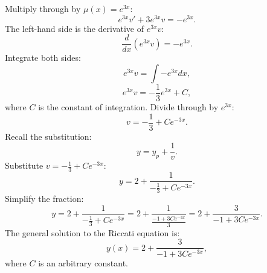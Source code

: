 \documentclass[12pt]{article}
\begin{document}
        Multiply through by \(\mu(x) = e^{3x}\):
        \[
        e^{3x}v' + 3e^{3x}v = -e^{3x}.
        \]
        The left-hand side is the derivative of \(e^{3x}v\):
        \[
        \frac{d}{dx}(e^{3x}v) = -e^{3x}.
        \]
        Integrate both sides:
        \[
        e^{3x}v = \int -e^{3x} dx,
        \]
        \[
        e^{3x}v = -\frac{1}{3}e^{3x} + C,
        \]
        where \(C\) is the constant of integration.
        Divide through by \(e^{3x}\):
        \[
        v = -\frac{1}{3} + Ce^{-3x}.
        \]
        Recall the substitution:
        \[
        y = y_p + \frac{1}{v}.
        \]
        Substitute \(v = -\frac{1}{3} + Ce^{-3x}\):
        \[
        y = 2 + \frac{1}{-\frac{1}{3} + Ce^{-3x}}.
        \]
        Simplify the fraction:
        \[
        y = 2 + \frac{1}{-\frac{1}{3} + Ce^{-3x}} = 2 + \frac{1}{\frac{-1 + 3Ce^{-3x}}{3}} = 2 + \frac{3}{-1 + 3Ce^{-3x}}.
        \]
        The general solution to the Riccati equation is:
        \[
        y(x) = 2 + \frac{3}{-1 + 3Ce^{-3x}},
        \]
        where \(C\) is an arbitrary constant.
\end{document}
